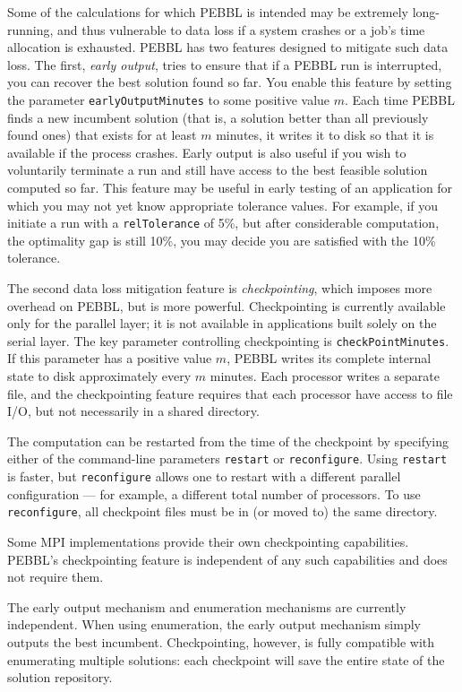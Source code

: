 Some of the calculations for which PEBBL is intended may be extremely
long-running, and thus vulnerable to data loss if a system crashes
or a job's time allocation is exhausted.  PEBBL has two features
designed to mitigate such data loss.  The first, \emph{early output},
tries to ensure that if a PEBBL run is interrupted, you can recover
the best solution found so far.  You enable this feature by setting
the parameter \texttt{earlyOutputMinutes} to some positive value $m$.
Each time PEBBL finds a new incumbent solution (that is, a solution
better than all previously found ones) that exists for at least $m$
minutes, it writes it to disk so that it is available if
the process crashes. Early output is also useful if you wish to
voluntarily terminate a run and still have access to the best feasible
solution computed so far.  
This feature may be useful in early testing of an application for which you
may not yet know appropriate tolerance values.  For example, if you initiate
a run with a \texttt{relTolerance} of 5\%, but after considerable computation,
the optimality 
gap is still 10\%, you may decide you are satisfied with the 10\%
tolerance.

The second data loss mitigation feature is \emph{checkpointing}, which
imposes more overhead on PEBBL, but is more powerful.  Checkpointing is
currently available only for the parallel layer; it is not available
in applications built solely on the serial layer.  The key parameter
controlling checkpointing is \texttt{checkPointMinutes}.  If this
parameter has a positive value $m$, PEBBL writes its complete
internal state to disk approximately every $m$ minutes. Each processor
writes a separate file, and the checkpointing feature requires that
each processor have access to file I/O, but not necessarily in a
shared directory.

The computation can be restarted from the time of the checkpoint by
specifying either of the command-line parameters \texttt{restart} or
\texttt{reconfigure}.  Using \texttt{restart} is faster, but
\texttt{reconfigure} allows one to restart with a different parallel
configuration --- for example, a different total number of processors.
To use \texttt{reconfigure}, all checkpoint files must be in (or moved
to) the same directory.

Some MPI implementations provide their own checkpointing capabilities.
PEBBL's checkpointing feature is independent of any such capabilities
and does not require them.  

The early output mechanism and enumeration mechanisms are
currently independent.  When using enumeration, the early output mechanism
simply outputs the best incumbent.  Checkpointing, however, is fully
compatible with enumerating multiple solutions: each checkpoint will
save the entire state of the solution repository.




